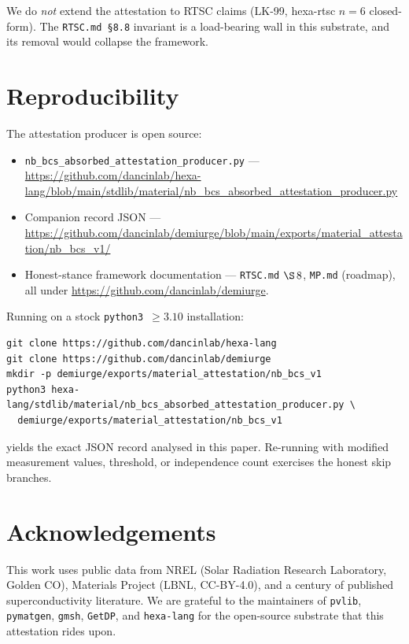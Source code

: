 \documentclass[11pt,a4paper]{article}
\begin{document}
We do \emph{not} extend the attestation to RTSC claims (LK-99,
hexa-rtsc \(n=6\) closed-form). The \texttt{RTSC.md \S 8.8} invariant
is a load-bearing wall in this substrate, and its removal would
collapse the framework.

\section*{Reproducibility}

The attestation producer is open source:
\begin{itemize}
\item \texttt{nb\_bcs\_absorbed\_attestation\_producer.py} ---
  \url{https://github.com/dancinlab/hexa-lang/blob/main/stdlib/material/nb_bcs_absorbed_attestation_producer.py}
\item Companion record JSON ---
  \url{https://github.com/dancinlab/demiurge/blob/main/exports/material_attestation/nb_bcs_v1/}
\item Honest-stance framework documentation ---
  \texttt{RTSC.md} \(\S\,8\), \texttt{MP.md} (roadmap), all under
  \url{https://github.com/dancinlab/demiurge}.
\end{itemize}

Running on a stock \texttt{python3 \(\ge 3.10\)} installation:
\begin{verbatim}
git clone https://github.com/dancinlab/hexa-lang
git clone https://github.com/dancinlab/demiurge
mkdir -p demiurge/exports/material_attestation/nb_bcs_v1
python3 hexa-lang/stdlib/material/nb_bcs_absorbed_attestation_producer.py \
  demiurge/exports/material_attestation/nb_bcs_v1
\end{verbatim}
yields the exact JSON record analysed in this paper. Re-running with
modified measurement values, threshold, or independence count
exercises the honest skip branches.

\section*{Acknowledgements}

This work uses public data from NREL (Solar Radiation Research
Laboratory, Golden CO), Materials Project (LBNL, CC-BY-4.0), and a
century of published superconductivity literature. We are grateful
to the maintainers of \texttt{pvlib}, \texttt{pymatgen}, \texttt{gmsh},
\texttt{GetDP}, and \texttt{hexa-lang} for the open-source substrate
that this attestation rides upon.



\end{document}
